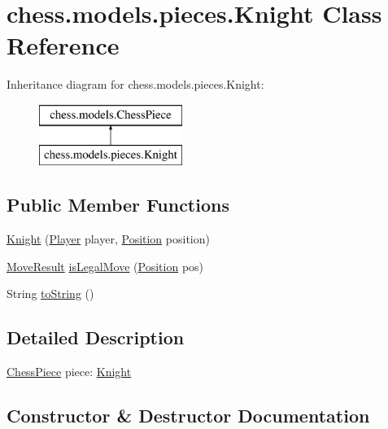 \hypertarget{classchess_1_1models_1_1pieces_1_1_knight}{}\section{chess.\+models.\+pieces.\+Knight Class Reference}
\label{classchess_1_1models_1_1pieces_1_1_knight}
Inheritance diagram for chess.\+models.\+pieces.\+Knight\+:\begin{figure}[H]
\begin{center}
\leavevmode
\includegraphics[height=2.000000cm]{classchess_1_1models_1_1pieces_1_1_knight}
\end{center}
\end{figure}
\subsection*{Public Member Functions}
\begin{DoxyCompactItemize}
\item 
\mbox{\hyperlink{classchess_1_1models_1_1pieces_1_1_knight_aa435be794e37d426954f2853a4aac26a}{Knight}} (\mbox{\hyperlink{enumchess_1_1models_1_1enums_1_1_player}{Player}} player, \mbox{\hyperlink{classchess_1_1models_1_1_position}{Position}} position)
\item 
\mbox{\hyperlink{enumchess_1_1models_1_1enums_1_1_move_result}{Move\+Result}} \mbox{\hyperlink{classchess_1_1models_1_1pieces_1_1_knight_af1018a686f81f9627d2851c919280448}{is\+Legal\+Move}} (\mbox{\hyperlink{classchess_1_1models_1_1_position}{Position}} pos)
\item 
String \mbox{\hyperlink{classchess_1_1models_1_1pieces_1_1_knight_a18c83fa9040a0035d86c3354f3ada4ea}{to\+String}} ()
\end{DoxyCompactItemize}


\subsection{Detailed Description}
\mbox{\hyperlink{classchess_1_1models_1_1_chess_piece}{Chess\+Piece}} piece\+: \mbox{\hyperlink{classchess_1_1models_1_1pieces_1_1_knight}{Knight}} 

\subsection{Constructor \& Destructor Documentation}
\mbox{\label{classchess_1_1models_1_1pieces_1_1_knight_aa435be794e37d426954f2853a4aac26a}} 
